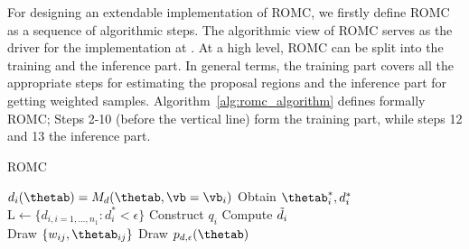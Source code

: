 For designing an extendable implementation of ROMC, we firstly define
ROMC as a sequence of algorithmic steps. The algorithmic view of ROMC
serves as the driver for the implementation at . At a high
level, ROMC can be split into the training and the inference part. In
general terms, the training part covers all the appropriate steps for
estimating the proposal regions and the inference part for getting
weighted samples. Algorithm~\ref{alg:romc_algorithm} defines formally
ROMC; Steps 2-10 (before the vertical line) form the training part,
while steps 12 and 13 the inference part.

\begin{algorithm}[!ht]
	\caption{ROMC}\label{alg:romc_algorithm}
	\begin{algorithmic}[1]
      \State $d_i(\thetab) = M_d(\thetab, \vb=\vb_i)$ 
      \State Obtain $\thetab_i^*, d_i^*$ 
    \EndFor
    \State $\text{L} \gets \{d_{i, i = 1, ..., n_1}: d_i^* < \epsilon \} $ 
      \State Construct $q_i$ 
      \State Compute $\Tilde{d}_i$ 
      \EndFor
    \\\hrulefill
    \State Draw $\{w_{ij}, \thetab_{ij}\}$ 
    \State Draw $p_{d,\epsilon}(\thetab)$     
    \EndProcedure
	\end{algorithmic}
\end{algorithm}

